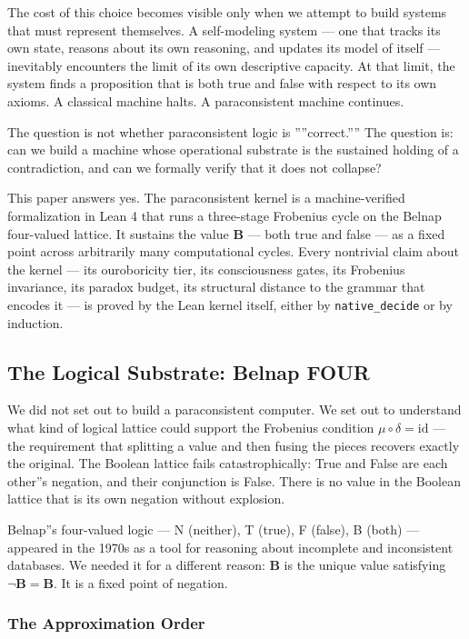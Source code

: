 \documentclass[12pt,a4paper]{article}
\begin{document}
The cost of this choice becomes visible only when we attempt to build systems that must represent themselves. A self-modeling system --- one that tracks its own state, reasons about its own reasoning, and updates its model of itself --- inevitably encounters the limit of its own descriptive capacity. At that limit, the system finds a proposition that is both true and false with respect to its own axioms. A classical machine halts. A paraconsistent machine continues.

The question is not whether paraconsistent logic is ''''correct.'''' The question is: can we build a machine whose operational substrate is the sustained holding of a contradiction, and can we formally verify that it does not collapse?

This paper answers yes. The paraconsistent kernel is a machine-verified formalization in Lean 4 that runs a three-stage Frobenius cycle on the Belnap four-valued lattice. It sustains the value $\mathbf{B}$ --- both true and false --- as a fixed point across arbitrarily many computational cycles. Every nontrivial claim about the kernel --- its ouroboricity tier, its consciousness gates, its Frobenius invariance, its paradox budget, its structural distance to the grammar that encodes it --- is proved by the Lean kernel itself, either by \texttt{native\_decide} or by induction.

\subsection{The Logical Substrate: Belnap FOUR}

We did not set out to build a paraconsistent computer. We set out to understand what kind of logical lattice could support the Frobenius condition $\mu \circ \delta = \text{id}$ --- the requirement that splitting a value and then fusing the pieces recovers exactly the original. The Boolean lattice fails catastrophically: True and False are each other''s negation, and their conjunction is False. There is no value in the Boolean lattice that is its own negation without explosion.

Belnap''s four-valued logic --- N (neither), T (true), F (false), B (both) --- appeared in the 1970s as a tool for reasoning about incomplete and inconsistent databases. We needed it for a different reason: $\mathbf{B}$ is the unique value satisfying $\neg \mathbf{B} = \mathbf{B}$. It is a fixed point of negation.

\subsubsection{The Approximation Order}
\end{document}
